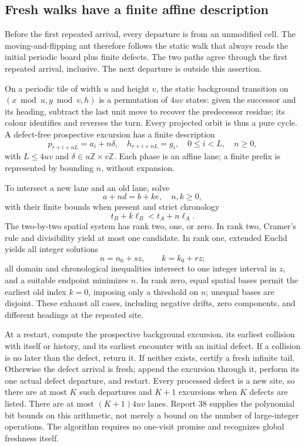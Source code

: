 \documentclass[11pt,letterpaper]{article}
\theoremstyle{definition}\newtheorem{definition}[theorem]{Definition}
\theoremstyle{remark}\newtheorem{remark}[theorem]{Remark}
\newcommand{\Z}{\mathbb Z}\newcommand{\N}{\mathbb N}\newcommand{\Zp}{\mathbb Z_{>0}}
\begin{document}
\subsection{Fresh walks have a finite affine description}
Before the first repeated arrival, every departure is from an unmodified cell. The moving-and-flipping ant therefore follows the static walk that always reads the initial periodic board plus finite defects. The two paths agree through the first repeated arrival, inclusive. The next departure is outside this assertion.

On a periodic tile of width $u$ and height $v$, the static background transition on $(x\bmod u,y\bmod v,h)$ is a permutation of $4uv$ states: given the successor and its heading, subtract the last unit move to recover the predecessor residue; its colour identifies and reverses the turn. Every projected orbit is thus a pure cycle. A defect-free prospective excursion has a finite description
\begin{equation}\label{ptr:la:eq:lanes}
 p_{r+i+nL}=a_i+n\delta,\quad h_{r+i+nL}=g_i,
 \quad 0\le i<L,\quad n\ge0,
\end{equation}
with $L\le4uv$ and $\delta\in u\Z\times v\Z$. Each phase is an affine lane; a finite prefix is represented by bounding $n$, without expansion.

To intersect a new lane and an old lane, solve
\[
 a+n d=b+k e,\quad n,k\ge0,
\]
with their finite bounds when present and strict chronology
\[
 t_B+k\ell_B<t_A+n\ell_A.
\]
The two-by-two spatial system has rank two, one, or zero. In rank two, Cramer's rule and divisibility yield at most one candidate. In rank one, extended Euclid yields all integer solutions
\[
 n=n_0+sz,\qquad k=k_0+rz;
\]
all domain and chronological inequalities intersect to one integer interval in $z$, and a suitable endpoint minimizes $n$. In rank zero, equal spatial bases permit the earliest old index $k=0$, imposing only a threshold on $n$; unequal bases are disjoint. These exhaust all cases, including negative drifts, zero components, and different headings at the repeated site.

At a restart, compute the prospective background excursion, its earliest collision with itself or history, and its earliest encounter with an initial defect. If a collision is no later than the defect, return it. If neither exists, certify a fresh infinite tail. Otherwise the defect arrival is fresh; append the excursion through it, perform its one actual defect departure, and restart. Every processed defect is a new site, so there are at most $K$ such departures and $K+1$ excursions when $K$ defects are listed. There are at most $(K+1)4uv$ lanes. Report 38 supplies the polynomial bit bounds on this arithmetic, not merely a bound on the number of large-integer operations. The algorithm requires no one-visit promise and recognizes global freshness itself.
\end{document}
